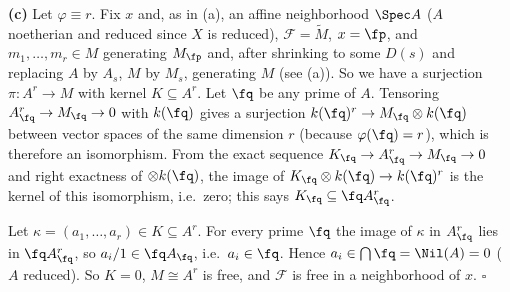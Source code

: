 \documentclass[11pt]{article}
\begin{document}
\textbf{(c)} Let $\varphi\equiv r$. Fix $x$ and, as in (a), an affine neighborhood $\Spec A$ ($A$ noetherian and reduced since $X$ is reduced), $\mathcal F=\widetilde M$, $x=\fp$, and $m_1,\dots,m_r\in M$ generating $M_\fp$ and, after shrinking to some $D(s)$ and replacing $A$ by $A_s$, $M$ by $M_s$, generating $M$ (see (a)). So we have a surjection $\pi:A^r\to M$ with kernel $K\subseteq A^r$. Let $\fq$ be any prime of $A$. Tensoring $A_\fq^r\to M_\fq\to0$ with $k(\fq)$ gives a surjection $k(\fq)^r\to M_\fq\otimes k(\fq)$ between vector spaces of the same dimension $r$ (because $\varphi(\fq)=r$), which is therefore an isomorphism. From the exact sequence $K_\fq\to A_\fq^r\to M_\fq\to0$ and right exactness of $\otimes k(\fq)$, the image of $K_\fq\otimes k(\fq)\to k(\fq)^r$ is the kernel of this isomorphism, i.e.\ zero; this says $K_\fq\subseteq\fq A_\fq^r$.

Let $\kappa=(a_1,\dots,a_r)\in K\subseteq A^r$. For every prime $\fq$ the image of $\kappa$ in $A_\fq^r$ lies in $\fq A_\fq^r$, so $a_i/1\in\fq A_\fq$, i.e.\ $a_i\in\fq$. Hence $a_i\in\bigcap\fq=\Nil(A)=0$ ($A$ reduced). So $K=0$, $M\cong A^r$ is free, and $\mathcal F$ is free in a neighborhood of $x$. \hfill$\square$
\end{document}
